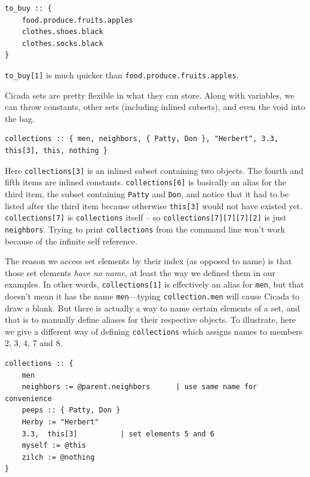 \documentclass{article}
\newenvironment{code}{
       \begin{list}{}{
               \setlength{\leftmargin}{.4in}
               \setlength{\rightmargin}{0in}
               \setlength{\topsep}{.2in}
       }
       \small
       \item[] }
       { \end{list}   }
\begin{document}
\begin{code} \begin{verbatim}
to_buy :: {
    food.produce.fruits.apples
    clothes.shoes.black
    clothes.socks.black
}
\end{verbatim} \end{code}

\noindent \verb#to_buy[1]# is much quicker than \texttt{food.produce.fruits.apples}.

Cicada sets are pretty flexible in what they can store.  Along with variables, we can throw constants, other sets (including inlined subsets), and even the void into the bag.

\begin{code} \begin{verbatim}
collections :: { men, neighbors, { Patty, Don }, "Herbert", 3.3, this[3], this, nothing }
\end{verbatim} \end{code}

\noindent Here \verb#collections[3]# is an inlined subset containing two objects.  The fourth and fifth items are inlined constants.  \verb#collections[6]# is basically an alias for the third item, the subset containing \verb#Patty# and \verb#Don#, and notice that it had to be listed after the third item because otherwise \texttt{this[3]} would not have existed yet.  \verb#collections[7]# is \verb#collections# itself -- so \verb#collections[7][7][7][2]# is just \verb#neighbors#.  Trying to print \verb#collections# from the command line won't work because of the infinite self reference.

The reason we access set elements by their index (as opposed to name) is that those set elements \emph{have no name}, at least the way we defined them in our examples.  In other words, \verb#collections[1]# is effectively an alias for \verb#men#, but that doesn't mean it has the name \verb#men#---typing \texttt{collection.men} will cause Cicada to draw a blank.  But there is actually a way to name certain elements of a set, and that is to manually define aliases for their respective objects.  To illustrate, here we give a different way of defining \texttt{collections} which assigns names to members 2, 3, 4, 7 and 8.

\begin{code} \begin{verbatim}
collections :: {
    men
    neighbors := @parent.neighbors      | use same name for convenience
    peeps :: { Patty, Don }
    Herby := "Herbert"
    3.3,  this[3]          | set elements 5 and 6
    myself := @this
    zilch := @nothing
}
\end{verbatim} \end{code}
\end{document}

